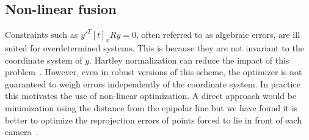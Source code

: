\subsection{Non-linear fusion}

Constraints such as $y'^T[t]_xRy = 0$, often referred to as algebraic errors, are ill suited for overdetermined systems. This is because they are not invariant to the coordinate system of $y$. Hartley normalization can reduce the impact of this problem~\cite{hartley1997defense}. However, even in robust versions of this scheme, the optimizer is not guaranteed to weigh errors independently of the coordinate system. In practice this motivates the use of non-linear optimization. A direct approach would be minimization using the distance from the epipolar line but we have found it is better to optimize the reprojection errors of points forced to lie in front of each camera~\cite{mythesis}. 
